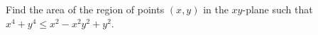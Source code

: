 Find the area of the region of points $(x, y)$ in the $xy$-plane such that
$x^4 + y^4 \le x^2 - x^2 y^2 + y^2$.
